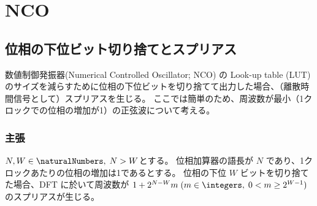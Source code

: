 \chapter{NCO}
    \section{位相の下位ビット切り捨てとスプリアス}
        数値制御発振器(Numerical Controlled Oscillator; NCO) の Look-up table (LUT) のサイズを減らすために位相の下位ビットを切り捨てて出力した場合、（離散時間信号として）スプリアスを生じる。
        ここでは簡単のため、周波数が最小（1クロックでの位相の増加が1）の正弦波について考える。
        \subsection{主張}
            \begin{shadebox}
                $N,W\in\naturalNumbers,\;N>W$とする。
                位相加算器の語長が $N$ であり、1クロックあたりの位相の増加は1であるとする。
                位相の下位 $W$ ビットを切り捨てた場合、DFT に於いて周波数が $1 + 2^{N-W}m\;(m\in\integers,\;0<m\geq 2^{W-1})$ のスプリアスが生じる。
            \end{shadebox}
